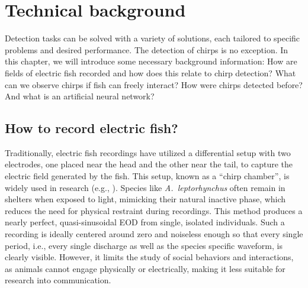 \chapter{Technical background}
\label{chap:background}

Detection tasks can be solved with a variety of solutions, each tailored to
specific problems and desired performance. The detection of chirps is no
exception. In this chapter, we will introduce some necessary background
information: How are fields of electric fish recorded and how does this relate
to chirp detection? What can we observe chirps if fish can freely interact? How
were chirps detected before? And what is an artificial neural network?

\section{How to record electric fish?}
\label{sec:recording}

Traditionally, electric fish recordings have utilized a differential setup with
two electrodes, one placed near the head and the other near the tail, to
capture the electric field generated by the fish. This setup, known as a
\enquote{chirp chamber}, is widely used in research (e.g.,
\cite{dunlapProductionAggressiveElectrocommunication2003,
fugereElectricSignalsSpecies2010}). Species like \textit{A.~leptorhynchus}
often remain in shelters when exposed to light, mimicking their natural
inactive phase, which reduces the need for physical restraint during
recordings. This method produces a nearly perfect, quasi-sinusoidal
\acrfull{EOD} from single, isolated individuals. Such a recording is ideally
centered around zero and noiseless enough so that every single period, i.e.,
every single discharge as well as the species specific waveform, is clearly
visible. However, it limits the study of social behaviors and interactions, as
animals cannot engage physically or electrically, making it less suitable for
research into communication.

